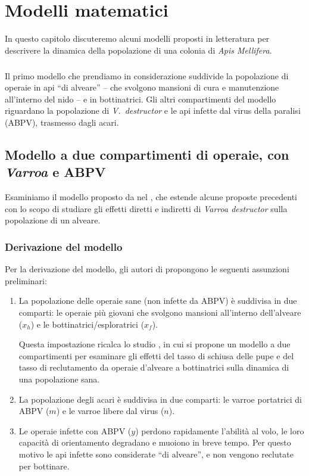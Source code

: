 \chapter[Modelli]{Modelli matematici}
In questo capitolo discuteremo alcuni modelli proposti in letteratura per descrivere la dinamica della popolazione di una colonia di \emph{Apis Mellifera}.

\paragraph{}
Il primo modello che prendiamo in considerazione \parencite{ratti2017} suddivide la popolazione di operaie in api ``di alveare'' -- che svolgono mansioni di cura e manutenzione all'interno del nido -- e in bottinatrici.
Gli altri compartimenti del modello riguardano la popolazione di \emph{V.~destructor} e le api infette dal virus della paralisi (ABPV), trasmesso dagli acari.

\section{Modello a due compartimenti di operaie, con \emph{Varroa} e ABPV}
Esaminiamo il modello proposto da \citeauthor{ratti2017} nel \citeyear{ratti2017}, che estende alcune proposte precedenti con lo scopo di studiare gli effetti diretti e indiretti di \emph{Varroa destructor} sulla popolazione di un alveare.

\subsection{Derivazione del modello}
Per la derivazione del modello, gli autori di \cite{ratti2017} propongono le seguenti assunzioni preliminari:
\begin{enumerate}
    \item La popolazione delle operaie sane (non infette da ABPV) è suddivisa in due comparti: le operaie più giovani che svolgono mansioni all'interno dell'alveare ($x_h$) e le bottinatrici/esploratrici ($x_f$).

    Questa impostazione ricalca lo studio \cite{khoury2011}, in cui si propone un modello a due compartimenti per esaminare gli effetti del tasso di schiusa delle pupe e del tasso di reclutamento da operaie d'alveare a bottinatrici sulla dinamica di una popolazione sana.
    \item La popolazione degli acari è suddivisa in due comparti: le varroe portatrici di ABPV ($m$) e le varroe libere dal virus ($n$).
    \item Le operaie infette con ABPV ($y$) perdono rapidamente l'abilità al volo, le loro capacità di orientamento degradano e muoiono in breve tempo. Per questo motivo le api infette sono considerate ``di alveare'', e non vengono reclutate per bottinare.
\end{enumerate}

